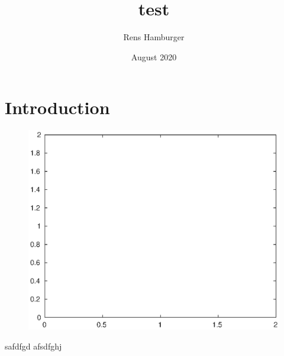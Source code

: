 \documentclass{article}
\title{test}
\author{Rens Hamburger}
\date{August 2020}
\begin{document}
\maketitle

\section{Introduction}

\begin{figure}
	\centering
	\includegraphics[width=0.6\linewidth,keepaspectratio]{figures/empty4.eps}
\end{figure}
safdfgd
afsdfghj
\end{document}
